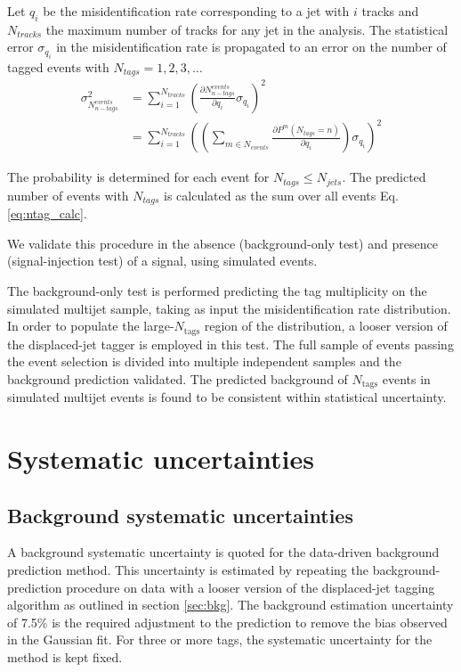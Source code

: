 Let $q_i$ be the misidentification rate corresponding to a jet with $i$ tracks and
 $N_{tracks}$ the maximum number of tracks for any jet in the analysis.
 The statistical error $\sigma_{q_i}$ in the misidentification rate is propagated to 
an error on the number of tagged events with $N_{tags} = 1,2,3,\ldots$
\begin{align*}
\sigma_{N_{n-tags}^{events}}^2 &=  \sum_{i = 1}^{N_{tracks}} \left (\frac{\partial N_{n-tags}^{events}}{\partial q_i}  \sigma_{q_i} \right)^{2} \\
 &=  \sum_{i = 1}^{N_{tracks}} \left ( \left (\sum_{m\in N_{events}} \frac{\partial P^m(N_{tags}=n)}{\partial q_i} \right) \sigma_{q_i} \right)^{2} 
\label{eq:ntag_prob_error}
\end{align*}

The probability is determined for each event for $N_{tags} \leq N_{jets}$. The predicted number of events with
$N_{tags}$ is calculated as the sum over all events Eq. \ref{eq:ntag_calc}. 

We validate this procedure in the absence (background-only test) and
presence (signal-injection test) of a signal, using simulated events.

The background-only test is performed predicting the tag multiplicity
on the simulated multijet sample, taking as input the misidentification rate
distribution. In order to populate the large-$N_{\textrm{tags}}$
region of the distribution, a looser version of the displaced-jet
tagger is employed in this test. The full sample of events passing the
event selection is divided into multiple independent samples and the background
prediction validated. The predicted background of $N_{\textrm{tags}}$ events
in simulated multijet events is found to be consistent within statistical uncertainty. 




\section{Systematic uncertainties}
\label{sec:sys}

\subsection{Background systematic uncertainties}
\label{sec:bkgsys}

A background systematic uncertainty is quoted for the data-driven background prediction
method. This uncertainty is estimated by repeating the
background-prediction procedure on data with a looser version of the
displaced-jet tagging algorithm as outlined in section \ref{sec:bkg}.  The
background estimation uncertainty of 7.5\% is the required adjustment
to the prediction to remove the bias observed in the Gaussian fit.  For three or more tags, the systematic uncertainty for the
method is kept fixed.

